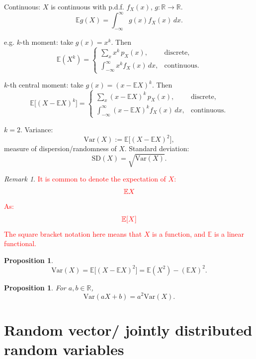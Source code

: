 \documentclass[11pt]{article}
\theoremstyle{plain}
\newtheorem{proposition}[theorem]{Proposition}
\theoremstyle{definition}
\theoremstyle{remark}
\newtheorem{remark}[theorem]{Remark}
\begin{document}
	Continuous: \(X\) is continuous with p.d.f. \(f_X(x)\), \(g:\mathbb{R}\to\mathbb{R}\).
	\[
	\mathbb{E}g(X)=\int_{-\infty}^{\infty} g(x) f_X(x)\,dx.
	\]
	
	e.g. \(k\)-th moment: take \(g(x)=x^k\). Then
	\[
	\mathbb{E}(X^k)=
	\begin{cases}
		\displaystyle\sum_x x^k\,p_X(x), & \text{discrete},\\[10pt]
		\displaystyle\int_{-\infty}^{\infty} x^k f_X(x)\,dx, & \text{continuous}.
	\end{cases}
	\]
	
	\(k\)-th central moment: take \(g(x)=(x-\mathbb{E}X)^k\). Then
	\[
	\mathbb{E}\big[(X-\mathbb{E}X)^k\big]=
	\begin{cases}
		\displaystyle\sum_x (x-\mathbb{E}X)^k\,p_X(x), & \text{discrete},\\[10pt]
		\displaystyle\int_{-\infty}^{\infty} (x-\mathbb{E}X)^k f_X(x)\,dx, & \text{continuous}.
	\end{cases}
	\]
	
	\(k=2\). Variance:
	\[
	\mathrm{Var}(X):=\mathbb{E}\big[(X-\mathbb{E}X)^2\big],
	\]
	measure of dispersion/randomness of \(X\).
	Standard deviation:
	\[
	\mathrm{SD}(X)=\sqrt{\mathrm{Var}(X)}.
	\]
	\begin{remark}
	    \textcolor{red}{It is common to denote the expectation of $X$:}
        \begin{align*}
            \textcolor{red}{\mathbb{E}X}
        \end{align*}
        \textcolor{red}{As:}
        \begin{align*}
            \textcolor{red}{\mathbb{E}[X]}
        \end{align*}
        \textcolor{red}
        {
            The square bracket notation here means that $X$ is a function,
            and $\mathbb{E}$ is a linear functional.
        }
	\end{remark}
	\begin{proposition}
		\[
		\mathrm{Var}(X)=\mathbb{E}\big[(X-\mathbb{E}X)^2\big]=\mathbb{E}(X^2)-(\mathbb{E}X)^2.
		\]
	\end{proposition}
	
	\begin{proposition}
		For \(a,b\in\mathbb{R}\),
		\[
		\mathrm{Var}(aX+b)=a^2\mathrm{Var}(X).
		\]
	\end{proposition}
	
	
	\section{Random vector/ jointly distributed random variables}
	
\end{document}
